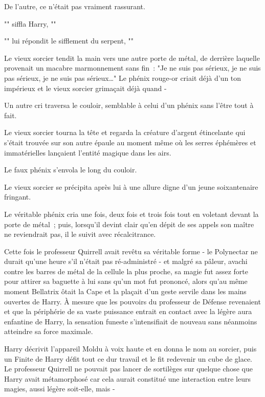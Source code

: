 De l'autre, ce n'était pas vraiment rassurant.

"" siffla Harry, ""

"" lui répondit le sifflement du serpent, ""

\later

Le vieux sorcier tendit la main vers une autre porte de métal, de derrière laquelle provenait un macabre marmonnement sans fin~: "Je ne suis pas sérieux, je ne suis pas sérieux, je ne suis pas sérieux…" Le phénix rouge-or criait déjà d'un ton impérieux et le vieux sorcier grimaçait déjà quand -

Un autre cri traversa le couloir, semblable à celui d'un phénix sans l'être tout à fait.

Le vieux sorcier tourna la tête et regarda la créature d'argent étincelante qui s'était trouvée sur son autre épaule au moment même où les serres éphémères et immatérielles lançaient l'entité magique dans les airs.

Le faux phénix s'envola le long du couloir.

Le vieux sorcier se précipita après lui à une allure digne d'un jeune soixantenaire fringant.

Le véritable phénix cria une fois, deux fois et trois fois tout en voletant devant la porte de métal~; puis, lorsqu'il devint clair qu'en dépit de ses appels son maître ne reviendrait pas, il le suivit avec récalcitrance.

\later

Cette fois le professeur Quirrell avait revêtu sa véritable forme - le Polynectar ne durait qu'une heure s'il n'était pas ré-administré - et malgré sa pâleur, avachi contre les barres de métal de la cellule la plus proche, sa magie fut assez forte pour attirer sa baguette à lui sans qu'un mot fut prononcé, alors qu'au même moment Bellatrix ôtait la Cape et la plaçait d'un geste servile dans les mains ouvertes de Harry. À mesure que les pouvoirs du professeur de Défense revenaient et que la périphérie de sa vaste puissance entrait en contact avec la légère aura enfantine de Harry, la sensation funeste s'intensifiait de nouveau sans néanmoins atteindre sa force maximale.

Harry décrivit l'appareil Moldu à voix haute et en donna le nom au sorcier, puis un Finite de Harry défit tout ce dur travail et le fit redevenir un cube de glace. Le professeur Quirrell ne pouvait pas lancer de sortilèges sur quelque chose que Harry avait métamorphosé car cela aurait constitué une interaction entre leurs magies, aussi légère soit-elle, mais -

